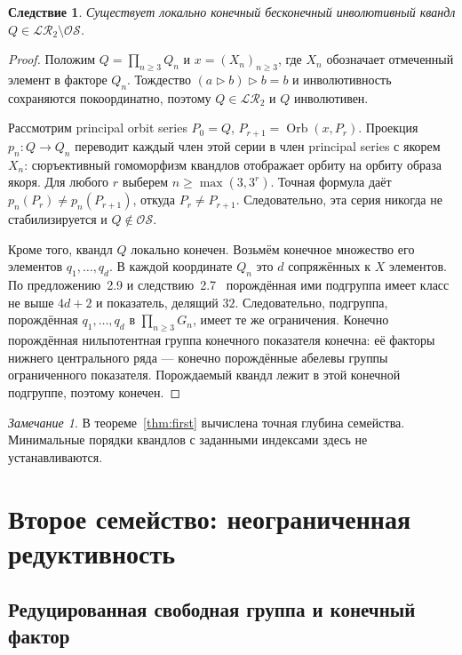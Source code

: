 \documentclass[11pt,a4paper]{article}
\newtheorem{corollary}[theorem]{Следствие}
\theoremstyle{definition}
\theoremstyle{remark}
\newtheorem{remark}[theorem]{Замечание}
\newcommand{\LR}{\mathcal{LR}}
\newcommand{\OS}{\mathcal{OS}}
\newcommand{\conj}{\triangleright}
\begin{document}
\begin{corollary}
Существует локально конечный бесконечный инволютивный квандл
\(Q\in\LR_2\setminus\OS\).
\end{corollary}
\begin{proof}
Положим \(Q=\prod_{n\ge3}Q_n\) и \(x=(X_n)_{n\ge3}\), где \(X_n\)
обозначает отмеченный элемент в факторе \(Q_n\). Тождество
\((a\conj b)\conj b=b\) и инволютивность сохраняются покоординатно,
поэтому \(Q\in\LR_2\) и \(Q\) инволютивен.

Рассмотрим principal orbit series \(P_0=Q\),
\(P_{r+1}=\operatorname{Orb}(x,P_r)\). Проекция
\(p_n:Q\to Q_n\) переводит каждый член этой серии в член principal
series с якорем \(X_n\): сюръективный гомоморфизм квандлов отображает
орбиту на орбиту образа якоря. Для любого \(r\) выберем
\(n\ge\max(3,3^r)\). Точная формула даёт
\(p_n(P_r)\ne p_n(P_{r+1})\), откуда \(P_r\ne P_{r+1}\).
Следовательно, эта серия никогда не стабилизируется и \(Q\notin\OS\).

Кроме того, квандл \(Q\) локально конечен. Возьмём конечное
множество его элементов \(q_1,\ldots,q_d\). В каждой координате
\(Q_n\) это \(d\) сопряжённых к \(X\) элементов. По
предложению~2.9 и следствию~2.7~\cite{NTT} порождённая ими подгруппа
имеет класс не выше \(4d+2\) и показатель, делящий \(32\).
Следовательно, подгруппа, порождённая \(q_1,\ldots,q_d\) в
\(\prod_{n\ge3}G_n\), имеет те же ограничения. Конечно порождённая
нильпотентная группа конечного показателя конечна: её факторы нижнего
центрального ряда — конечно порождённые абелевы группы ограниченного
показателя. Порождаемый квандл лежит в этой конечной подгруппе,
поэтому конечен.
\end{proof}

\begin{remark}
В теореме~\ref{thm:first} вычислена точная глубина семейства.
Минимальные порядки квандлов с заданными индексами здесь не устанавливаются.
\end{remark}

\section{Второе семейство: неограниченная редуктивность}
\label{sec:second}

\subsection{Редуцированная свободная группа и конечный фактор}
\end{document}
